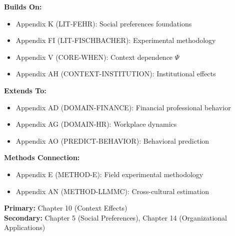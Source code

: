 \begin{tcolorbox}[colback=blue!5!white,colframe=blue!75!black,title=Cross-Reference Map]
\textbf{Builds On:}
\begin{itemize}
    \item Appendix K (LIT-FEHR): Social preferences foundations
    \item Appendix FI (LIT-FISCHBACHER): Experimental methodology
    \item Appendix V (CORE-WHEN): Context dependence $\Psi$
    \item Appendix AH (CONTEXT-INSTITUTION): Institutional effects
\end{itemize}

\textbf{Extends To:}
\begin{itemize}
    \item Appendix AD (DOMAIN-FINANCE): Financial professional behavior
    \item Appendix AG (DOMAIN-HR): Workplace dynamics
    \item Appendix AO (PREDICT-BEHAVIOR): Behavioral prediction
\end{itemize}

\textbf{Methods Connection:}
\begin{itemize}
    \item Appendix E (METHOD-E): Field experimental methodology
    \item Appendix AN (METHOD-LLMMC): Cross-cultural estimation
\end{itemize}
\end{tcolorbox}

\begin{tcolorbox}[colback=green!5!white,colframe=green!75!black,title=Chapter Linkage]
\textbf{Primary:} Chapter 10 (Context Effects) \\
\textbf{Secondary:} Chapter 5 (Social Preferences), Chapter 14 (Organizational Applications)
\end{tcolorbox}

\begin{abstract}
This appendix integrates Michel Maréchal's research on honesty, corporate culture, and cross-cultural behavior into the Evidence-Based Framework. Maréchal's work demonstrates how institutional context---particularly corporate culture and professional identity---shapes ethical behavior, with profound implications for organizational design and policy. His global studies reveal both universal patterns and cultural variation in civic honesty. The research provides critical parameters for the context function $\Psi$ and establishes predictive links between laboratory behavior and real-world outcomes.
\end{abstract}

